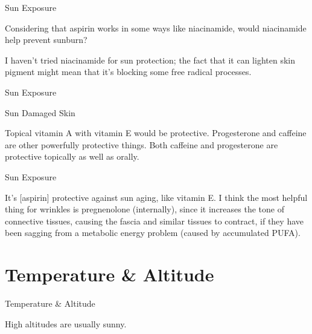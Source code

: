 \documentclass[11pt,oneside,openany,extrafontsizes]{memoir}
\begin{document}
\begin{qaexchange}{Sun Exposure}

    \begin{question}
        Considering that aspirin works in some ways like niacinamide, would niacinamide help prevent sunburn?
    \end{question}

    \begin{answer}
        I haven't tried niacinamide for sun protection; the fact that it can lighten skin pigment might mean that it's blocking some free radical processes.
    \end{answer}
\end{qaexchange}

\begin{standalonequote}{Sun Exposure}
    \begin{note}
        Sun Damaged Skin
    \end{note}

    \begin{answer}
        Topical vitamin A with vitamin E would be protective. Progesterone and caffeine are other powerfully protective things. Both caffeine and progesterone are protective topically as well as orally.
    \end{answer}
\end{standalonequote}

\begin{standalonequote}{Sun Exposure}

    \begin{answer}
        It's [aspirin] protective against sun aging, like vitamin E. I think the most helpful thing for wrinkles is pregnenolone (internally), since it increases the tone of connective tissues, causing the fascia and similar tissues to contract, if they have been sagging from a metabolic energy problem (caused by accumulated PUFA).
    \end{answer}
\end{standalonequote}

\section{Temperature \& Altitude}

\begin{standalonequote}{Temperature \& Altitude}

    \begin{answer}
        High altitudes are usually sunny.
    \end{answer}
\end{standalonequote}
\end{document}
